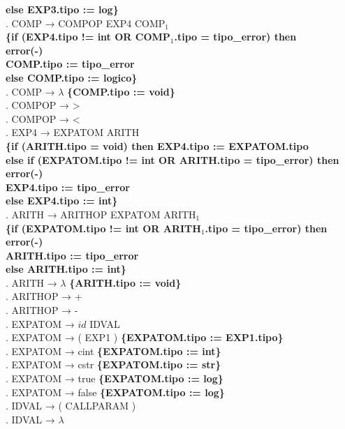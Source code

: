 \begin{tabbing}
    \>                     \> \textbf{else EXP3.tipo := log\}}\\
    . COMP → COMPOP EXP4 COMP$_1$\\
    \>                     \>\textbf{\{if (EXP4.tipo != int OR COMP$_1$.tipo = tipo\_error) then}\\
    \>                     \> \> \textbf{error(-)}\\
    \>                     \> \> \textbf{COMP.tipo := tipo\_error}\\
    \>                     \> \textbf{else COMP.tipo := logico\}}\\
    . COMP → $\lambda$ \textbf{\{COMP.tipo := void\}}\\
    . COMPOP → >\\
    . COMPOP → <\\
    . EXP4 → EXPATOM ARITH\\
    \>                     \>\textbf{\{if (ARITH.tipo = void) then EXP4.tipo := EXPATOM.tipo}\\
    \>                     \> \textbf{else if (EXPATOM.tipo != int OR ARITH.tipo = tipo\_error) then}\\
    \>                     \> \> \textbf{error(-)}\\
    \>                     \> \> \textbf{EXP4.tipo := tipo\_error}\\
    \>                     \> \textbf{else EXP4.tipo := int\}}\\
    . ARITH → ARITHOP EXPATOM ARITH$_1$\\
    \>                     \>\textbf{\{if (EXPATOM.tipo != int OR ARITH$_1$.tipo = tipo\_error) then}\\
    \>                     \> \> \textbf{error(-)}\\
    \>                     \> \> \textbf{ARITH.tipo := tipo\_error}\\
    \>                     \> \textbf{else ARITH.tipo := int\}}\\
    . ARITH → $\lambda$ \textbf{\{ARITH.tipo := void\}}\\
    . ARITHOP → +\\
    . ARITHOP → -\\
    . EXPATOM → $id$ IDVAL\\
    . EXPATOM → ( EXP1 ) \>\textbf{\{EXPATOM.tipo := EXP1.tipo\}}\\
    . EXPATOM → cint \>\textbf{\{EXPATOM.tipo := int\}}\\
    . EXPATOM → cstr \>\textbf{\{EXPATOM.tipo := str\}}\\
    . EXPATOM → true \>\textbf{\{EXPATOM.tipo := log\}}\\
    . EXPATOM → false \>\textbf{\{EXPATOM.tipo := log\}}\\
    . IDVAL → ( CALLPARAM )\\
    . IDVAL → $\lambda$\\
\end{tabbing}